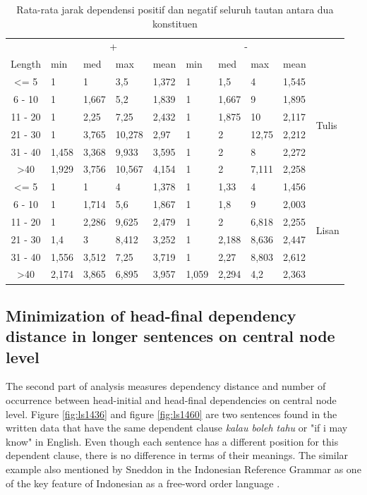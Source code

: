 \documentclass[10pt, a4paper, conference, compsocconf]{IEEEtran}
\begin{document}
\begin{table}
\begin{center}
\tiny
\caption{Rata-rata jarak dependensi positif dan negatif seluruh tautan antara dua konstituen}  \label{tab:deskriptif-mdd}
\begin{tabular}{c l l l l l l l l l}
\hline
 & \multicolumn{4}{c}{+} & \multicolumn{4}{c}{-} & \\  \cline{2-9}  
Length & min 	& med	& max 	& mean 	& min 	& med 	& max 	& mean 	& \\ \cline{1-10}  
\textless= 5 	& 1 		& 1 		& 3,5	 	& 1,372 	& 1 		& 1,5 	& 4	 	& 1,545 	&\multirow{6}{*}{Tulis}\\
6 - 10 		& 1 		& 1,667	& 5,2 	& 1,839 	& 1 		& 1,667 	& 9	 	& 1,895 	& 	\\
11 - 20 		& 1 		& 2,25 	& 7,25 	& 2,432 	& 1 		& 1,875 	& 10	 	& 2,117 	& 	\\
21 - 30 		& 1 		& 3,765 	& 10,278 	& 2,97 	& 1 		& 2 		& 12,75	& 2,212 	& 	\\ 
31 - 40 		& 1,458 	& 3,368 	& 9,933	& 3,595 	& 1 		& 2 		& 8		& 2,272 	& 	\\
\textgreater 40 	& 1,929 	& 3,756	& 10,567 	& 4,154 	& 1 		& 2 		& 7,111	& 2,258 	& 	\\ 
\hline
\textless= 5 	& 1 		& 1 		& 4	 	& 1,378 	& 1 		& 1,33 	& 4		& 1,456 	& \multirow{6}{*}{Lisan}\\
6 - 10 		& 1 		& 1,714	& 5,6 	& 1,867 	& 1 		& 1,8		& 9		& 2,003 	& \\
11 - 20 		& 1 		& 2,286 	& 9,625 	& 2,479 	& 1 		& 2 		& 6,818	& 2,255 	& \\
21 - 30 		& 1,4 	& 3	 	& 8,412 	& 3,252	& 1 		& 2,188	& 8,636	& 2,447 	& \\ 
31 - 40 		& 1,556 	& 3,512 	& 7,25	& 3,719 	& 1 		& 2,27	& 8,803	& 2,612 	& \\
\textgreater 40 	& 2,174 	& 3,865	& 6,895 	& 3,957 	& 1,059 	& 2,294	& 4,2		& 2,363 	& \\ 
\hline
   \end{tabular}
\end{center}
\end{table}

\subsection{Minimization of head-final dependency distance in longer sentences on central node level}
The second part of analysis measures dependency distance and number of occurrence between head-initial and head-final dependencies on central node level. Figure \ref{fig:ls1436} and figure \ref{fig:ls1460} are two sentences found in the written data that have the same dependent clause \textit{kalau boleh tahu} or "if i may know" in English. Even though each sentence has a different position for this dependent clause, there is no difference in terms of their meanings. The similar example also mentioned by Sneddon in the Indonesian Reference Grammar as one of the key feature of Indonesian as a free-word order language \cite{sneddon2010indonesian}.
\end{document}
